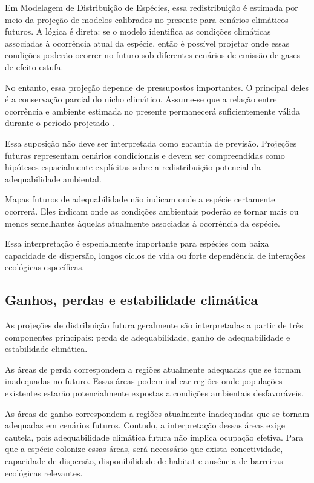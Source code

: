 Em Modelagem de Distribuição de Espécies, essa redistribuição é estimada por meio da projeção de modelos calibrados no presente para cenários climáticos futuros. A lógica é direta: se o modelo identifica as condições climáticas associadas à ocorrência atual da espécie, então é possível projetar onde essas condições poderão ocorrer no futuro sob diferentes cenários de emissão de gases de efeito estufa.

No entanto, essa projeção depende de pressupostos importantes. O principal deles é a conservação parcial do nicho climático. Assume-se que a relação entre ocorrência e ambiente estimada no presente permanecerá suficientemente válida durante o período projetado \parencite{peterson2011}.

Essa suposição não deve ser interpretada como garantia de previsão. Projeções futuras representam cenários condicionais e devem ser compreendidas como hipóteses espacialmente explícitas sobre a redistribuição potencial da adequabilidade ambiental.

\begin{atencao}
	Mapas futuros de adequabilidade não indicam onde a espécie certamente ocorrerá. Eles indicam onde as condições ambientais poderão se tornar mais ou menos semelhantes àquelas atualmente associadas à ocorrência da espécie.
\end{atencao}

Essa interpretação é especialmente importante para espécies com baixa capacidade de dispersão, longos ciclos de vida ou forte dependência de interações ecológicas específicas.

\subsection{Ganhos, perdas e estabilidade climática}

As projeções de distribuição futura geralmente são interpretadas a partir de três componentes principais: perda de adequabilidade, ganho de adequabilidade e estabilidade climática.

As áreas de perda correspondem a regiões atualmente adequadas que se tornam inadequadas no futuro. Essas áreas podem indicar regiões onde populações existentes estarão potencialmente expostas a condições ambientais desfavoráveis.

As áreas de ganho correspondem a regiões atualmente inadequadas que se tornam adequadas em cenários futuros. Contudo, a interpretação dessas áreas exige cautela, pois adequabilidade climática futura não implica ocupação efetiva. Para que a espécie colonize essas áreas, será necessário que exista conectividade, capacidade de dispersão, disponibilidade de habitat e ausência de barreiras ecológicas relevantes.


